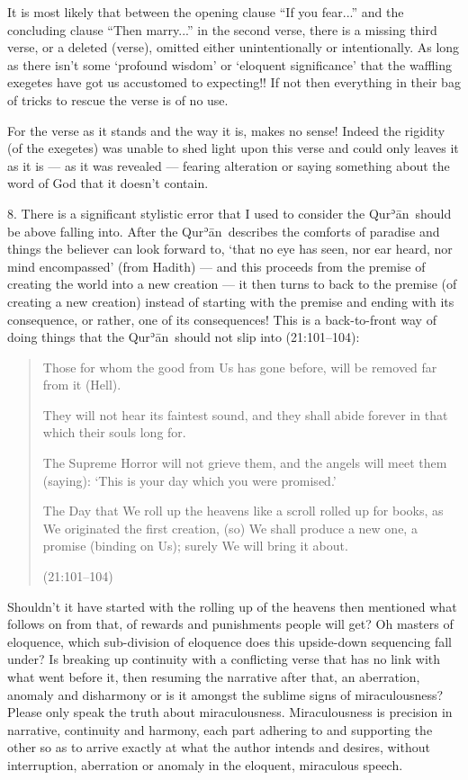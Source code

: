 \documentclass[12pt]{memoir}
\def\´{ʾ} %
\def \Quran{Qur\-\´ān} %
\def\–{-\hskip0pt}
\newcommand{\QRef}[1]{{\color{darkblue}#1}}
\begin{document}
It is most likely that between the opening clause “If you fear...”
and the concluding clause “Then marry...” in the second verse,
there is a missing third verse, or a deleted (verse),
omitted either unintentionally or intentionally.
As long as there isn’t some ‘profound wisdom’ or ‘eloquent significance’
that the waffling exegetes have got us accustomed to expecting!!
If not then everything in their bag of tricks
to rescue the verse is of no use.

For the verse as it stands and the way it is, makes no sense!
Indeed the rigidity (of the exegetes) was unable to shed light
upon this verse and could only leaves it as it is — as it was revealed —
fearing alteration or saying something about the word of God
that it doesn’t contain.

8. There is a significant stylistic error
that I used to consider the \Quran\ should be above falling into.
After the \Quran\ describes the comforts of paradise
and things the believer can look forward to,
‘that no eye has seen, nor ear heard, nor mind encompassed’ (from Hadith) —
and this proceeds from the premise of creating the world into a new creation —
it then turns to back to the premise (of creating a new creation)
instead of starting with the premise and ending with its consequence,
or rather, one of its consequences!
This is a back-to-front way of doing things
that the \Quran\ should not slip into (\QRef{21:101–104}):

\begin{quote}
Those for whom the good from Us has gone before,
will be removed far from it (Hell).

They will not hear its faintest sound,
and they shall abide forever in that which their souls long for.

The Supreme Horror will not grieve them,
and the angels will meet them (saying):
‘This is your day which you were promised.’

The Day that We roll up the heavens like a scroll rolled up for books,
as We originated the first creation, (so) We shall produce a new one,
a promise (binding on Us); surely We will bring it about.

(\QRef{21:101–104})
\end{quote}

Shouldn’t it have started with the rolling up of the heavens
then mentioned what follows on from that,
of rewards and punishments people will get?
Oh masters of eloquence, which sub\–division of eloquence
does this upside\–down sequencing fall under?
Is breaking up continuity with a conflicting verse
that has no link with what went before it,
then resuming the narrative after that, an aberration,
anomaly and disharmony or is it amongst the sublime signs of miraculousness?
Please only speak the truth about miraculousness.
Miraculousness is precision in narrative, continuity and harmony,
each part adhering to and supporting the other so as to arrive exactly
at what the author intends and desires, without interruption,
aberration or anomaly in the eloquent, miraculous speech.
\end{document}
